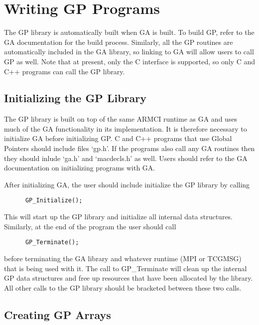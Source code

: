 \chapter{Writing GP Programs}

The GP library is automatically built when GA is built. To build GP, refer to
the GA documentation for the build process. Similarly, all the GP routines are
automatically included in the GA library, so linking to GA will allow users to
call GP as well. Note that at present, only the C interface is supported, so
only C and C++ programs can call the GP library.

\section{Initializing the GP Library}

The GP library is built on top of the same ARMCI runtime as GA and uses much of
the GA functionality in its implementation. It is therefore necessary to
initialize GA before initializing GP. C and C++ programs that use Global Pointers should
include files `gp.h'. If the programs also call any GA routines then they
should inlude `ga.h' and `macdecls.h' as well. Users should refer
to the GA documentation on initializing programs with GA.

After initializing GA, the user should include initialize the GP library by
calling

\begin{verbatim}
      GP_Initialize();
\end{verbatim}

\noindent
This will start up the GP library and initialize all internal data structures.
Similarly, at the end of the program the user should call

\begin{verbatim}
      GP_Terminate();
\end{verbatim}

\noindent
before terminating the GA library and whatever runtime (MPI or TCGMSG) that is
being used with it. The call to GP\_Terminate will clean up the internal GP data
structures and free up resources that have been allocated by the library. All
other calls to the GP library should be bracketed between these two calls.

\section{Creating GP Arrays}

